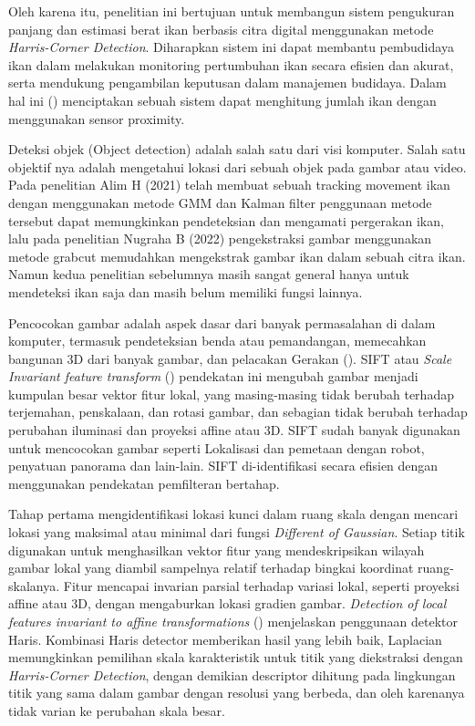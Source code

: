 Oleh karena itu, penelitian ini bertujuan untuk membangun sistem pengukuran panjang dan estimasi berat ikan berbasis citra digital menggunakan metode \emph{Harris-Corner Detection}. Diharapkan sistem ini dapat membantu pembudidaya ikan dalam melakukan monitoring pertumbuhan ikan secara efisien dan akurat, serta mendukung pengambilan keputusan dalam manajemen budidaya. Dalam hal ini (\cite{Amri2020}) menciptakan sebuah sistem dapat menghitung jumlah ikan dengan menggunakan sensor proximity.

Deteksi objek (Object detection) adalah salah satu dari visi komputer. Salah satu objektif nya adalah mengetahui lokasi dari sebuah objek pada gambar atau video. 
Pada penelitian Alim H (2021) telah membuat sebuah tracking movement ikan dengan menggunakan metode GMM dan Kalman filter penggunaan metode tersebut dapat memungkinkan 
pendeteksian dan mengamati pergerakan ikan, lalu pada penelitian Nugraha B (2022) pengekstraksi gambar menggunakan metode grabcut memudahkan mengekstrak gambar ikan dalam sebuah citra ikan. 
Namun kedua penelitian sebelumnya masih sangat general hanya untuk mendeteksi ikan saja dan masih belum memiliki fungsi lainnya. 

Pencocokan gambar adalah aspek dasar dari banyak permasalahan di dalam komputer, termasuk pendeteksian benda atau pemandangan, memecahkan bangunan 3D dari banyak gambar, dan pelacakan Gerakan (\cite{Lowe2004}). 
SIFT atau \emph{Scale Invariant feature transform} (\cite{Lowe1999}) pendekatan ini mengubah gambar menjadi kumpulan besar vektor fitur lokal, yang masing-masing tidak berubah terhadap terjemahan, penskalaan, dan rotasi gambar, dan sebagian tidak berubah terhadap perubahan iluminasi dan proyeksi affine atau 3D. 
SIFT sudah banyak digunakan untuk mencocokan gambar seperti Lokalisasi dan pemetaan dengan robot, penyatuan panorama dan lain-lain. SIFT di-identifikasi secara efisien dengan menggunakan pendekatan pemfilteran bertahap. 

Tahap pertama mengidentifikasi lokasi kunci dalam ruang skala dengan mencari lokasi yang maksimal atau minimal dari fungsi \emph{Different of Gaussian}. 
Setiap titik digunakan untuk menghasilkan vektor fitur yang mendeskripsikan wilayah gambar lokal yang diambil sampelnya relatif terhadap bingkai koordinat ruang-skalanya. Fitur mencapai invarian parsial terhadap variasi lokal, 
seperti proyeksi affine atau 3D, dengan mengaburkan lokasi gradien gambar. \emph{Detection of local features invariant to affine transformations} (\cite{Mikolajczyk2004}) menjelaskan penggunaan detektor Haris. 
Kombinasi Haris detector memberikan hasil yang lebih baik, Laplacian memungkinkan pemilihan skala karakteristik untuk titik yang diekstraksi dengan \emph{Harris-Corner Detection}, dengan demikian descriptor dihitung pada lingkungan titik yang sama dalam gambar dengan resolusi yang berbeda, dan oleh karenanya tidak varian ke perubahan skala besar.

